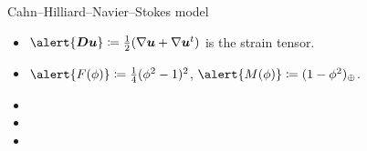 \begin{frame}{Cahn--Hilliard--Navier--Stokes model}
\begin{itemize}
      \item<1> $\alert{\DD\uu} \coloneqq \frac{1}{2}(\nabla\uu+\nabla\uu^t)$ is the strain tensor.
      \item<1> $\alert{F(\phi)}\coloneqq\frac{1}{4}(\phi^2-1)^2$, $\alert{M(\phi)}\coloneqq(1-\phi^2)_\oplus$.
      \item<2> 
      \item<3> 
      \item<4> 
  \end{itemize}
\end{frame}

